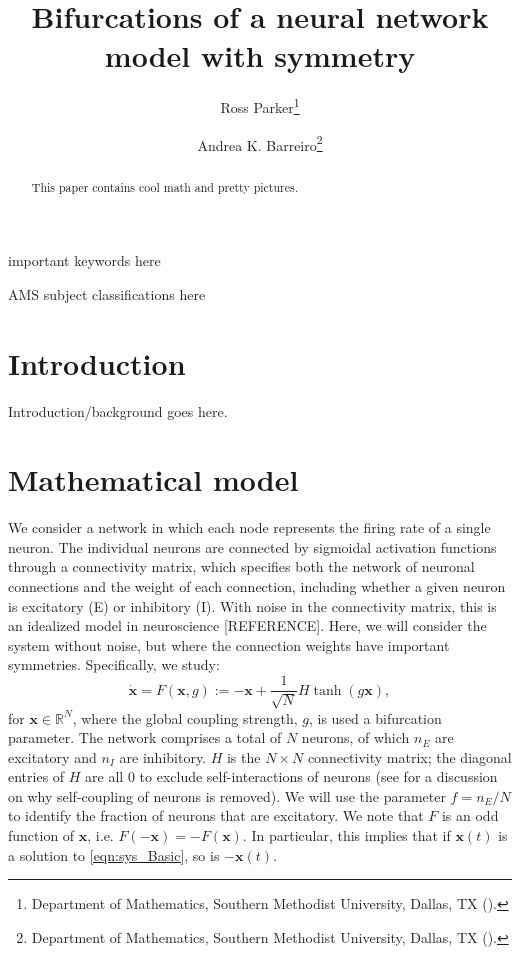 \documentclass[reqno]{siamonline190516}
\title{Bifurcations of a neural network model with symmetry}
\author{Ross Parker\thanks{Department of Mathematics, Southern Methodist University, Dallas, TX (\email{rhparker@smu.edu}).}
\and Andrea K. Barreiro\thanks{Department of Mathematics, Southern Methodist University, Dallas, TX (\email{abarreiro@smu.edu}).}
}
\newcommand{\xvec}{\mathbf{x}}
\newcommand{\R}{\mathbb{R}}
\begin{document}

\maketitle

\begin{abstract}
  This paper contains cool math and pretty pictures.
\end{abstract}

\begin{keywords}
  important keywords here
\end{keywords}

\begin{AMS}
  AMS subject classifications here
\end{AMS}

\section{Introduction}

Introduction/background goes here.

\section{Mathematical model}\label{sec:model}

We consider a network in which each node represents the firing rate of a single neuron. The individual neurons are connected by sigmoidal activation functions through a connectivity matrix, which specifies both the network of neuronal connections and the weight of each connection, including whether a given neuron is excitatory (E) or inhibitory (I). With noise in the connectivity matrix, this is an idealized model in neuroscience [REFERENCE]. Here, we will consider the system without noise, but where the connection weights have important symmetries. Specifically, we study:
\begin{equation}\label{eqn:sys_Basic}
    \dot{\xvec} = 
    F(\xvec, g) := -\xvec  + \frac{1}{\sqrt{N}} H\tanh (g \xvec),
\end{equation}
for $\xvec \in \R^N$, where the global coupling strength, $g$, is used a bifurcation parameter. The network comprises a total of $N$ neurons, of which $n_E$ are excitatory and $n_I$ are inhibitory. $H$ is the $N \times N$ connectivity matrix; the diagonal entries of $H$ are all 0 to exclude self-interactions of neurons (see \cite[Sec. 2.1]{Barreiro2017} for a discussion on why self-coupling of neurons is removed). We will use the parameter $f = n_E / N$ to identify the fraction of neurons that are excitatory. We note that $F$ is an odd function of $\xvec$, i.e. $F(-\xvec) = -F(\xvec)$. In particular, this implies that if $\xvec(t)$ is a solution to \cref{eqn:sys_Basic}, so is $-\xvec(t)$.
\end{document}
